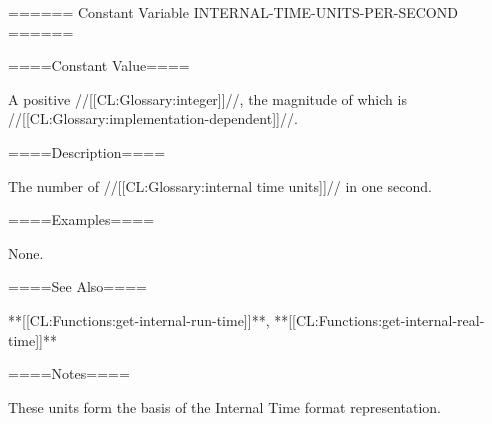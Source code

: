 ====== Constant Variable INTERNAL-TIME-UNITS-PER-SECOND ======

====Constant Value====

A positive //[[CL:Glossary:integer]]//, the magnitude of which is //[[CL:Glossary:implementation-dependent]]//.

====Description====

The number of //[[CL:Glossary:internal time units]]// in one second.

====Examples====

None.

====See Also====

**[[CL:Functions:get-internal-run-time]]**, **[[CL:Functions:get-internal-real-time]]**

====Notes====

These units form the basis of the Internal Time format representation.

